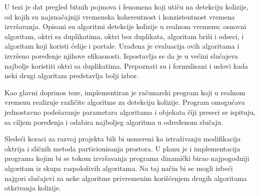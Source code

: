 \documentclass[12pt,oneside]{memoir}
\begin{document}
U tezi je dat pregled bitnih pojmova i fenomena koji utiču na detekciju kolizije, 
od kojih su najznačajniji vremenska koherentnost i konzistentnost vremena izvršavanja.
Opisani su algoritmi detekcije kolizije u realnom vremenu: osnovni algoritam, oktri sa duplikatima, oktri bez duplikata,
algoritam briši i odseci, i algoritam koji koristi ćelije i portale. 
Urađena je evaluacija ovih algoritama i izvršeno poređenje njihove efikasnosti.
Ispostavlja se da je u većini slučajeva najbolje koristiti oktri sa duplikatima.
Prepoznati su i formulisani i uslovi kada neki drugi algoritam predstavlja bolji izbor.

Kao glavni doprinos teze, implementiran je računarski program koji u realnom vremenu realizuje različite algoritme
za detekciju kolizije.
Program omogućava jednostavno podešavanje parametara algoritama i objekata čiji preseci se ispituju,
sa ciljem poređenja i odabira najboljeg algoritma u određenom slučaju.

Sledeći koraci za razvoj projekta bili bi usmereni ka istraživanju modifikacija oktrija 
i sličnih metoda particionisanja prostora.
U planu je i implementacija programa kojim bi se tokom izvršavanja programa dinamički birao najpogodniji algoritam iz skupa raspoloživih algoritama.
Na taj način bi se mogli izbeći najgori slučajevi za neke algoritme privremenim korišćenjem drugih  
algoritama otkrivanja kolizije.



\literatura

\backmatter


\end{document}
